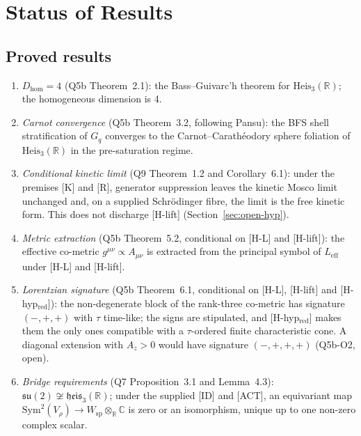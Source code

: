\documentclass[11pt,a4paper]{article}
\theoremstyle{definition}
\newcommand{\Heis}{\mathrm{Heis}}
\newcommand{\su}{\mathfrak{su}}
\newcommand{\heis}{\mathfrak{heis}}
\newcommand{\Leff}{L_{\mathrm{eff}}}
\newcommand{\geff}{g^{\mu\nu}}
\newcommand{\Dhom}{D_{\mathrm{hom}}}
\newcommand{\Sym}{\mathrm{Sym}}
\begin{document}
  \section{Status of Results}
    \label{sec:status}

    \subsection{Proved results}
      \label{sec:proved}

      \begin{enumerate}
        \item \textit{$\Dhom = 4$} (Q5b Theorem~2.1): the Bass--Guivarc'h theorem for
        $\Heis_3(\mathbb{R})$; the homogeneous dimension is 4.

        \item \textit{Carnot convergence} (Q5b Theorem~3.2, following Pansu): the BFS shell
        stratification of $G_q$ converges to the Carnot--Carath\'{e}odory sphere foliation of
        $\Heis_3(\mathbb{R})$ in the pre-saturation regime.

        \item \textit{Conditional kinetic limit} (Q9 Theorem~1.2 and Corollary~6.1): under the
        premises [K] and [R], generator suppression leaves the kinetic Mosco limit unchanged and,
        on a supplied Schr\"{o}dinger fibre, the limit is the free kinetic form.
        This does not discharge [H-lift] (Section~\ref{sec:open-hyp}).

        \item \textit{Metric extraction} (Q5b Theorem~5.2, conditional on [H-L] and [H-lift]):
        the effective co-metric $\geff \propto A_{\mu\nu}$ is extracted from the
        principal symbol of $\Leff$ under [H-L] and [H-lift].

        \item \textit{Lorentzian signature} (Q5b Theorem~6.1, conditional on [H-L], [H-lift] and
        [H-hyp$_{\mathrm{red}}$]): the non-degenerate block of the rank-three co-metric has signature
        $(-,+,+)$ with $\tau$ time-like; the signs are stipulated, and [H-hyp$_{\mathrm{red}}$] makes them
        the only ones compatible with a $\tau$-ordered finite characteristic cone.
        A diagonal extension with $A_z > 0$ would have signature $(-,+,+,+)$ (Q5b-O2, open).

        \item \textit{Bridge requirements} (Q7 Proposition~3.1 and Lemma~4.3): $\su(2) \not\cong
        \heis_3(\mathbb{R})$; under the supplied [ID] and [ACT], an equivariant map
        $\Sym^2(V_\rho) \to W_{\mathrm{sp}} \otimes_\mathbb{R} \mathbb{C}$ is zero or an
        isomorphism, unique up to one non-zero complex scalar.


\end{enumerate}
\end{document}
